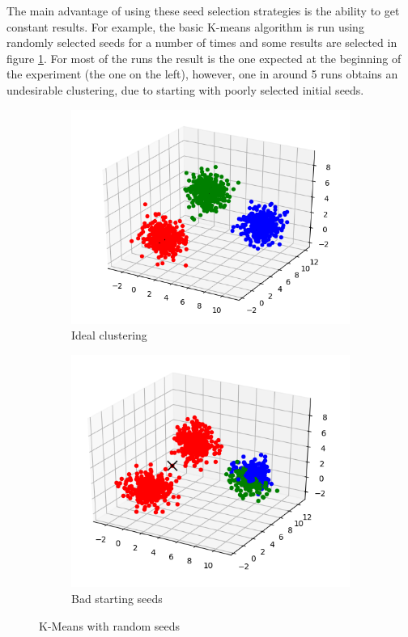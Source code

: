 \documentclass[12pt]{article}
\begin{document}
	The main advantage of using these seed selection strategies is the ability to get constant results. For example, the basic K-means algorithm is run using randomly selected seeds for a number of times and some results are selected in figure \ref{fig:noseeds}. For most of the runs the result is the one expected at the beginning of the experiment (the one on the left), however, one in around 5 runs obtains an undesirable clustering, due to starting with poorly selected initial seeds.
	
	\begin{figure}
	\centering
	\begin{subfigure}{.5\textwidth}
		\centering
		\includegraphics[width=.9\linewidth]{resources/OkKmeans.png}
		\caption{Ideal clustering}
	\end{subfigure}%
	\begin{subfigure}{.5\textwidth}
		\centering
		\includegraphics[width=.9\linewidth]{resources/BadKmeans.png}
		\caption{Bad starting seeds}
	\end{subfigure}
	\caption{K-Means with random seeds}
	\label{fig:noseeds}
	\end{figure}
	
\end{document}
